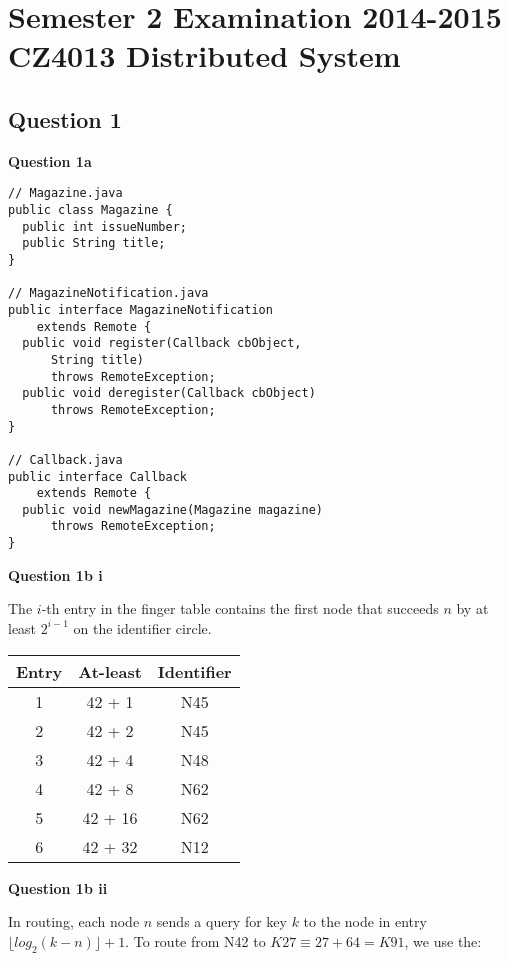 \documentclass[11pt,a4paper]{report}
\begin{document}
\chapter{Semester 2 Examination 2014-2015\\CZ4013 Distributed System}

\begin{multicols*}{2}

\section{Question 1}

\noindent \textbf{Question 1a}
\begin{verbatim}
// Magazine.java
public class Magazine {
  public int issueNumber;
  public String title;
}

// MagazineNotification.java
public interface MagazineNotification
    extends Remote {
  public void register(Callback cbObject,
      String title)
      throws RemoteException;
  public void deregister(Callback cbObject)
      throws RemoteException;
}

// Callback.java
public interface Callback
    extends Remote {
  public void newMagazine(Magazine magazine)
      throws RemoteException;
}
\end{verbatim}

\noindent \textbf{Question 1b i}

\noindent The $i$-th entry in the finger table contains the first node that succeeds $n$ by at least $2^{i-1}$ on the identifier circle.

\begin{center}
\begin{tabular}{|c|c|c|}
  \hline
  Entry & At-least & Identifier \\ \hline
  1     & 42 + 1   & N45        \\
  2     & 42 + 2   & N45        \\
  3     & 42 + 4   & N48        \\
  4     & 42 + 8   & N62        \\
  5     & 42 + 16  & N62        \\
  6     & 42 + 32  & N12        \\ \hline
\end{tabular}
\end{center}

\noindent \textbf{Question 1b ii}

\noindent In routing, each node $n$ sends a query for key $k$ to the node in entry $\lfloor log_2(k-n) \rfloor + 1$. To route from N42 to $K27 \equiv 27 + 64 = K91$, we use the:


\end{multicols*}
\end{document}
